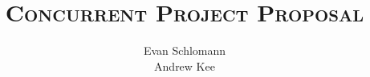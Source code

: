 \documentclass[12pt]{article}
\begin{document}
\doublespacing
\title{\Huge \textsc{Concurrent Project Proposal}}
\author{Evan Schlomann \\ Andrew Kee}

\maketitle
\vfill

\pagebreak



\vspace{.25in}



\vspace{.25in}



\vspace{.25in}



\vspace{.25in}
\end{document}
